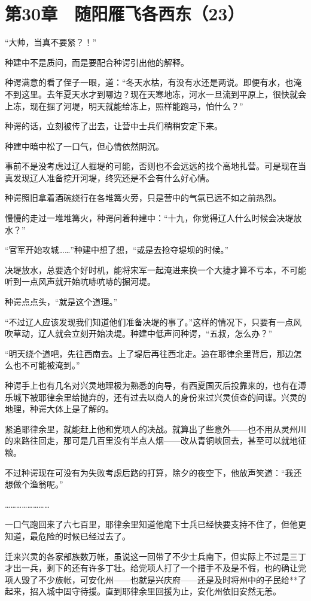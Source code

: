 \section{第30章　随阳雁飞各西东（23）}

“大帅，当真不要紧？！”

种建中不是质问，而是要配合种谔引出他的解释。

种谔满意的看了侄子一眼，道：“冬天水枯，有没有水还是两说。即便有水，也淹不到这里。去年夏天水才到哪边？现在天寒地冻，河水一旦流到平原上，很快就会上冻，现在掘了河堤，明天就能给冻上，照样能跑马，怕什么？”

种谔的话，立刻被传了出去，让营中士兵们稍稍安定下来。

种建中暗中松了一口气，但心情依然阴沉。

事前不是没考虑过辽人掘堤的可能，否则也不会远远的找个高地扎营。可是现在当真发现辽人准备挖开河堤，终究还是不会有什么好心情。

种谔照旧拿着酒碗绕行在各堆篝火旁，只是营中的气氛已远不如之前热烈。

慢慢的走过一堆堆篝火，种谔问着种建中：“十九，你觉得辽人什么时候会决堤放水？”

“官军开始攻城……”种建中想了想，“或是去抢夺堤坝的时候。”

决堤放水，总要选个好时机，能将宋军一起淹进来换一个大捷才算不亏本，不可能听到一点风声就开始吭哧吭哧的掘河堤。

种谔点点头，“就是这个道理。”

“不过辽人应该发现我们知道他们准备决堤的事了。”这样的情况下，只要有一点风吹草动，辽人就会立刻开始决堤。种建中低声问种谔，“五叔，怎么办？”

“明天绕个道吧，先往西南去。上了堤后再往西北走。追在耶律余里背后，那边怎么也不可能被淹到。”

种谔手上也有几名对兴灵地理极为熟悉的向导，有西夏国灭后投靠来的，也有在溥乐城下被耶律余里给抛弃的，还有过去以商人的身份来过兴灵侦查的间谍。兴灵的地理，种谔大体上是了解的。

紧追耶律余里，就能赶上他和党项人的决战。就算出了些意外——也不用从灵州川的来路往回走，那可是几百里没有半点人烟——改从青铜峡回去，甚至可以就地征粮。

不过种谔现在可没有为失败考虑后路的打算，除夕的夜空下，他放声笑道：“我还想做个渔翁呢。”

……………………

一口气跑回来了六七百里，耶律余里知道他麾下士兵已经快要支持不住了，但他更知道，最危险的时候已经过去了。

迁来兴灵的各家部族数万帐，虽说这一回带了不少士兵南下，但实际上不过是三丁才出一兵，剩下的还有许多丁壮。给党项人打了一个措手不及是不假，也的确让党项人毁了不少族帐，可安化州——也就是兴庆府——还是及时将州中的子民给**了起来，招入城中固守待援。直到耶律余里回援为止，安化州依旧安然无恙。

